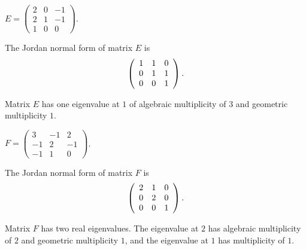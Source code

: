 \documentclass{ximera}
\begin{document}
\begin{exercise} \label{c10.5.4b}
$E = \left(\begin{array}{rrr} 2 & 0 & -1 \\  2 & 1 & -1 \\
1 & 0 & 0 \end{array}\right)$.

\begin{solution}
\ans The Jordan normal form of matrix $E$ is
\[
\left(\begin{array}{rrr} 1 & 1 & 0 \\ 0 & 1 & 1 \\ 0 & 0 & 1\end{array}\right).
\]

\soln Matrix $E$ has one eigenvalue at $1$ of algebraic multiplicity of $3$ and 
geometric multiplicity $1$.

\end{solution}
\end{exercise}
\begin{exercise} \label{c10.5.4c}
$F = \left(\begin{array}{rrr} 3 & -1 & 2 \\  -1 & 2 & -1 \\
-1 & 1 & 0 \end{array}\right)$.

\begin{solution}
\ans The Jordan normal form of matrix $F$ is
\[
\left(\begin{array}{rrr} 2 & 1 & 0 \\ 0 & 2 & 0 \\ 0 & 0 & 1\end{array}\right).
\]

\soln Matrix $F$ has two real eigenvalues.  The eigenvalue at $2$ has
algebraic multiplicity of $2$ and geometric multiplicity $1$, and the eigenvalue at 
$1$ has multiplicity of $1$.

\end{solution}
\end{exercise}
\end{document}
